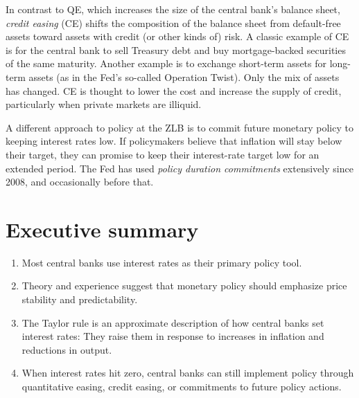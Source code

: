 In contrast to QE, which increases the size of the central bank's 
balance sheet, 
{\it credit easing\/} (CE) shifts the composition of the balance sheet
from default-free assets toward assets with credit (or other kinds of) risk.
A classic example of CE is for the central bank  to sell Treasury debt
and buy mortgage-backed securities of the same maturity. Another example
is to exchange short-term assets for long-term assets (as in the Fed's
so-called Operation Twist).
Only the mix of assets has changed.
CE is thought to lower the cost and increase the supply of credit,
particularly when private markets are illiquid.

A different approach to policy at the ZLB is to commit future monetary
policy to keeping interest rates low.
If policymakers believe that inflation will stay below their target,
they can promise to keep their interest-rate target low
for an extended period.
The Fed has used {\it   policy duration commitments\/}  
extensively since 2008, and occasionally before that.

\section*{Executive summary}

\begin{enumerate}
\item Most central banks use interest rates as their primary policy tool.

\item Theory and experience suggest that monetary policy
should emphasize price stability and predictability.

\item The Taylor rule is an approximate description of how
central banks set interest rates: They raise them in response to
increases in inflation and reductions in output.

\item When interest rates hit zero, central banks can still implement
policy through quantitative easing, credit easing, or
commitments to future policy actions.
\end{enumerate}


